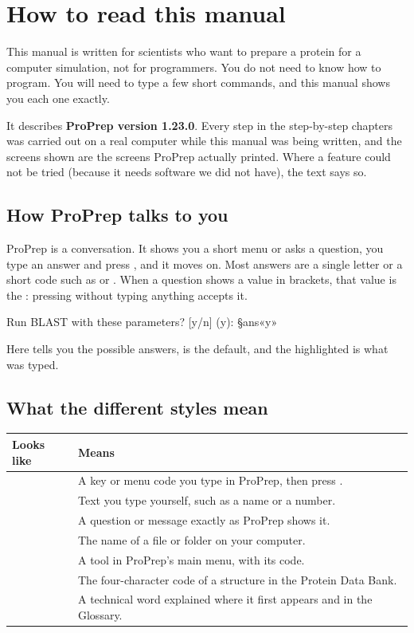 \chapter{How to read this manual}
\label{ch:howto}

This manual is written for scientists who want to prepare a protein for a
computer simulation, not for programmers. You do not need to know how to
program. You will need to type a few short commands, and this manual shows you
each one exactly.

It describes \textbf{ProPrep version 1.23.0}. Every step in the step-by-step
chapters was carried out on a real computer while this manual was being
written, and the screens shown are the screens ProPrep actually printed. Where a
feature could not be tried (because it needs software we did not have), the
text says so.

\section{How ProPrep talks to you}

ProPrep is a conversation. It shows you a short menu or asks a question, you
type an answer and press , and it moves on. Most answers are a single
letter or a short code such as  or . When a question shows a
value in brackets, that value is the : pressing 
without typing anything accepts it.

\begin{screen}
Run BLAST with these parameters? [y/n] (y): §ans«y»
\end{screen}

Here \prompt{[y/n]} tells you the possible answers,  is the
default, and the highlighted  is what was typed.

\section{What the different styles mean}

\begin{tabularx}{\linewidth}{@{}lL@{}}
\toprule
\textbf{Looks like} & \textbf{Means} \\
\midrule
{} & A key or menu code you type in ProPrep, then press . \\
 & Text you type yourself, such as a name or a number. \\
 & A question or message exactly as ProPrep shows it. \\
 & The name of a file or folder on your computer. \\
 & A tool in ProPrep's main menu, with its code. \\
 & The four-character code of a structure in the Protein Data Bank. \\
 & A technical word explained where it first appears and in the Glossary. \\
\bottomrule
\end{tabularx}

